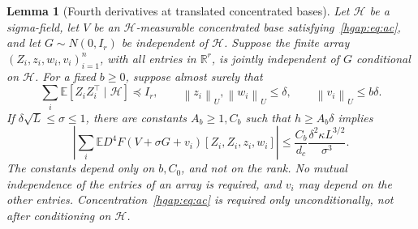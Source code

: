 \documentclass[11pt,letterpaper]{article}
\newtheorem{lemma}{Lemma}
\theoremstyle{remark}
\newcommand{\E}{\mathbb E}
\newcommand{\R}{\mathbb R}
\newcommand{\norm}[1]{\left\lVert#1\right\rVert}
\begin{document}
\begin{lemma}[Fourth derivatives at translated concentrated bases]
\label{hgap:thm:fourth}
Let $\mathcal H$ be a sigma-field, let $V$ be an $\mathcal H$-measurable
concentrated base satisfying~\eqref{hgap:eq:ac}, and let
$G\sim N(0,I_r)$ be independent of $\mathcal H$.
Suppose the finite array $(Z_i,z_i,w_i,v_i)_{i=1}^n$, with all entries
in $\R^r$, is jointly independent of $G$ conditional on $\mathcal H$.
For a fixed $b\ge0$, suppose almost surely that
\[
 \sum_i\E[Z_iZ_i^\top\mid\mathcal H]\preceq I_r,\qquad
 \norm{z_i}_U,\norm{w_i}_U\le\delta,\qquad
 \norm{v_i}_U\le b\delta.
\]
If $\delta\sqrt L\le\sigma\le1$, there are constants $A_b\ge1,C_b$
such that $h\ge A_b\delta$ implies
\begin{equation}
 \left|\sum_i\E D^4F(V+\sigma G+v_i)[Z_i,Z_i,z_i,w_i]\right|
 \le \frac{C_b}{d_c}\frac{\delta^2\kappa L^{3/2}}{\sigma^3}.
 \label{hgap:eq:fourth-bound}
\end{equation}
The constants depend only on $b,C_0$, and not on the rank. No mutual independence of the
entries of an array is required, and $v_i$ may depend on the other
entries. Concentration~\eqref{hgap:eq:ac} is required only unconditionally,
not after conditioning on $\mathcal H$.
\end{lemma}
\end{document}

